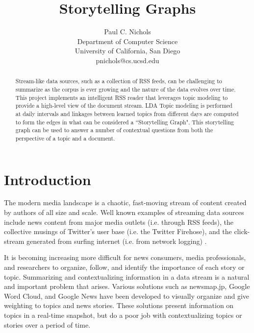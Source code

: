 \documentclass[10pt]{article}
\begin{document}
\title{Storytelling Graphs}
\author{
    Paul C. Nichols\\
    Department of Computer Science\\
    University of California, San Diego\\
    pnichols@cs.ucsd.edu
}
\date{}
\maketitle


\begin{abstract}
Stream-like data sources, such as a collection of RSS feeds, can be challenging to summarize as the corpus is ever growing and the nature of the data evolves over time.  This project implements an intelligent RSS reader that leverages topic modeling to provide a high-level view of the document stream.  LDA Topic modeling is performed at daily intervals and linkages between learned topics from different days are computed to form the edges in what can be considered a ``Storytelling Graph".  This storytelling graph can be used to answer a number of contextual questions from both the perspective of a topic and a document.
\end{abstract}

\section{Introduction}
The modern media landscape is a chaotic, fast-moving stream of content created by authors of all size and scale. Well known examples of streaming data sources include news content from major media outlets (i.e. through RSS feeds), the collective musings of Twitter's user base  (i.e. the Twitter Firehose), and the click-stream generated from surfing internet (i.e. from network logging) .

It is becoming increasing more difficult for news consumers, media professionals, and researchers to organize, follow, and identify the importance of each story or topic. Summarizing and contextualizing information in a data stream is a natural and important problem that arises. Various solutions such as newsmap.jp, Google Word Cloud, and Google News have been developed to visually organize and give weighting to topics and news stories. These solutions present information on topics in a real-time snapshot, but do a poor job with contextualizing topics or stories over a period of time. 
\end{document}
